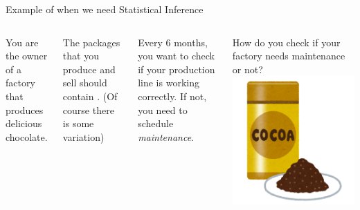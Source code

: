 \begin{frame}{Example of when we need Statistical Inference}
  \begin{columns}
    You are the owner of a factory that produces delicious chocolate.\bigskip

    The packages that you produce and sell should contain . (Of course there is some variation) \bigskip

    Every 6 months, you want to check if your production line is working correctly. If not, you need to schedule \emph{maintenance}.\bigskip

    How do you check if your factory needs maintenance or not?
    \hfill\includegraphics[width=1\textwidth]{../img/irasutoya_cocoa}
  \end{columns}\bigskip
\end{frame}

